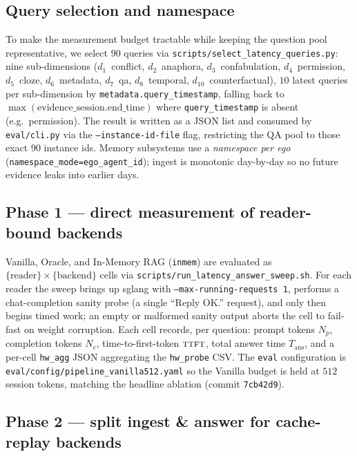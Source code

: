 \subsection{Query selection and namespace}
\label{app:lat:queries}

To make the measurement budget tractable while keeping the question pool
representative, we select $90$ queries via
\texttt{scripts/select\_latency\_queries.py}: nine sub-dimensions
($d_1$~conflict, $d_2$~anaphora, $d_3$~confabulation,
$d_4$~permission, $d_5$~cloze, $d_6$~metadata, $d_7$~qa,
$d_8$~temporal, $d_{10}$~counterfactual), $10$ latest
queries per sub-dimension by \texttt{metadata.query\_timestamp},
falling back to $\max(\text{evidence\_session.end\_time})$ where
\texttt{query\_timestamp} is absent (e.g.\ \DFour permission). The result
is written as a JSON list and consumed by \texttt{eval/cli.py} via the
\texttt{--instance-id-file} flag, restricting the QA pool to those
exact $90$ instance ids. Memory subsystems use a \emph{namespace per
ego} (\texttt{namespace\_mode=ego\_agent\_id}); ingest is monotonic
day-by-day so no future evidence leaks into earlier days.

\subsection{Phase 1 — direct measurement of reader-bound backends}
\label{app:lat:phase1}

Vanilla, Oracle, and In-Memory RAG (\texttt{inmem}) are evaluated as
$\{\text{reader}\}\times\{\text{backend}\}$ cells via
\texttt{scripts/run\_latency\_answer\_sweep.sh}. For each reader the
sweep brings up sglang with \texttt{--max-running-requests 1}, performs
a chat-completion sanity probe (a single ``Reply OK.'' request), and
only then begins timed work; an empty or malformed sanity output aborts
the cell to fail-fast on weight corruption. Each cell records, per
question: prompt tokens $N_p$, completion tokens $N_c$, time-to-first-token
$\textsc{ttft}$, total answer time $T_{\text{ans}}$, and a per-cell
\texttt{hw\_agg} JSON aggregating the \texttt{hw\_probe} CSV. The
\texttt{eval} configuration is
\texttt{eval/config/pipeline\_vanilla512.yaml} so the Vanilla budget is
held at $512$ session tokens, matching the headline ablation (commit
\texttt{7cb42d9}).

\subsection{Phase 2 — split ingest \& answer for cache-replay backends}
\label{app:lat:phase2}

